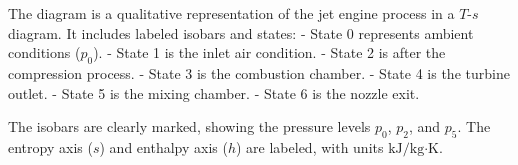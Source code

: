 The diagram is a qualitative representation of the jet engine process in a \( T \)-\( s \) diagram. It includes labeled isobars and states:  
- State 0 represents ambient conditions (\( p_0 \)).  
- State 1 is the inlet air condition.  
- State 2 is after the compression process.  
- State 3 is the combustion chamber.  
- State 4 is the turbine outlet.  
- State 5 is the mixing chamber.  
- State 6 is the nozzle exit.  

The isobars are clearly marked, showing the pressure levels \( p_0 \), \( p_2 \), and \( p_5 \). The entropy axis (\( s \)) and enthalpy axis (\( h \)) are labeled, with units \( \text{kJ/kg·K} \).
